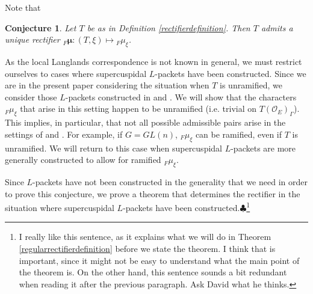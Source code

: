 \documentclass[11pt]{amsart}
\theoremstyle{plain}
\newtheorem{conjecture}[theorem]{Conjecture}
\newcommand{\MAxxx}[1]{$\clubsuit$\footnote{#1}}
\theoremstyle{definition}
\begin{document}
Note that

\begin{conjecture}
  Let $T$ be as in Definition \ref{rectifierdefinition}.  Then $T$
  admits a unique rectifier ${}_F \boldsymbol\mu : (T, \xi) \mapsto
  {}_F \mu_{\xi}$.
\end{conjecture}

As the local Langlands correspondence is not known in general, we must restrict
ourselves to cases where supercuspidal $L$-packets have been constructed.
Since we are in the present paper considering the situation when $T$ is unramified,
we consider those $L$-packets constructed in \cite{debackerreeder} and \cite{reeder}.
We will show that the characters ${}_F \mu_{\xi}$ that arise in this setting
happen to be unramified (i.e. trivial on $T(\mathcal{O}_E)_{\Gamma}$).  This implies,
in particular, that not all possible admissible pairs arise in the settings
of \cite{debackerreeder} and \cite{reeder}.
For example, if $G = GL(n)$, ${}_F \mu_{\xi}$ can be ramified,
even if $T$ is unramified.  We will return to this case when supercuspidal $L$-packets
are more generally constructed to allow for ramified ${}_F \mu_{\xi}$.

Since $L$-packets have not been constructed in the generality that
we need in order to prove this conjecture, we prove a theorem that determines
the rectifier in the situation where supercuspidal $L$-packets have been
constructed.\MAxxx{I really like this sentence, as it explains what we will do
in Theorem \ref{regularrectifierdefinition} before we state the theorem. I think
that is important, since it might not be easy to understand what the main
point of the theorem is.  On the other hand, this sentence sounds a bit
redundant when reading it after the previous paragraph.  Ask David what
he thinks.}
\end{document}
